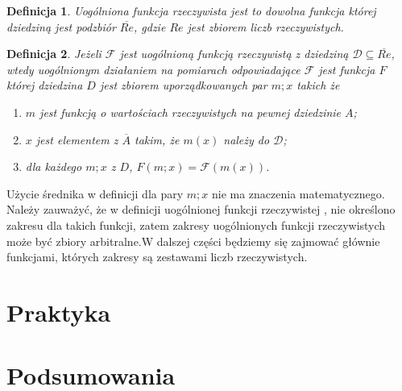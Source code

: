 \documentclass[12pt,a4paper]{report}
\newtheorem{definition}{Definicja}
\begin{document}
\begin{definition}
Uogólniona funkcja rzeczywista jest to dowolna funkcja której dziedziną jest podzbiór $\overline{Re}$, gdzie $Re$ jest zbiorem liczb rzeczywistych.
\end{definition}
\begin{definition}
Jeżeli $\mathcal{F}$ jest uogólnioną funkcją rzeczywistą z dziedziną $\mathcal{D}\subseteq\overline{Re}$, wtedy uogólnionym działaniem na pomiarach odpowiadające $\mathcal{F}$ jest funkcja $F$ której dziedzina $D$ jest zbiorem uporządkowanych par $m;x$ takich że
\begin{enumerate}
\item
$m$ jest funkcją o wartościach rzeczywistych na pewnej dziedzinie $A$;
\item
$x$ jest elementem z $\overline{A}$ takim, że $m(x)$ należy do $\mathcal{D}$;
\item
dla każdego $m;x$ z $D$, $F(m;x)=\mathcal{F}(m(x))$.
\end{enumerate}

\end{definition}
Użycie średnika w definicji dla pary $m;x$ nie ma znaczenia matematycznego. Należy zauważyć, że w definicji uogólnionej funkcji rzeczywistej , nie określono zakresu dla takich funkcji, zatem zakresy uogólnionych funkcji rzeczywistych może być zbiory arbitralne.W dalszej części będziemy się zajmować głównie funkcjami, których zakresy są zestawami liczb rzeczywistych. 
\chapter{Praktyka}

\chapter{Podsumowania}



\end{document}
